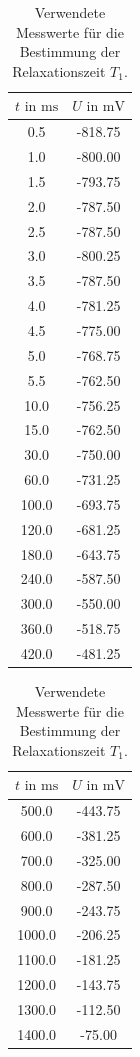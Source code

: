 \begin{table}
  \centering
  \caption{Verwendete Messwerte für die Bestimmung der Relaxationszeit $T_{1}$.}
  \label{tab:t1}
  \begin{tabular}{c c|}
  \toprule
  $t \text{ in } \si{\milli\second}$ & $U \text{ in } \si{\milli\volt}$\\
  \midrule
  0.5	&	-818.75   \\
  1.0	&	-800.00   \\
  1.5	&	-793.75   \\
  2.0	&	-787.50   \\
  2.5	&	-787.50   \\
  3.0	&	-800.25   \\
  3.5	&	-787.50   \\
  4.0	&	-781.25   \\
  4.5	&	-775.00   \\
  5.0	&	-768.75   \\
  5.5	&	-762.50   \\
  10.0	&	-756.25   \\
  15.0	&	-762.50   \\
  30.0	&	-750.00   \\
  60.0	&	-731.25   \\
  100.0	&	-693.75   \\
  120.0	&	-681.25   \\
  180.0	&	-643.75   \\
  240.0	&	-587.50   \\
  300.0	&	-550.00   \\
  360.0	&	-518.75   \\
  420.0	&	-481.25   \\
  \bottomrule
  \end{tabular}
  \begin{tabular}{|c c}
  \toprule
  $t \text{ in } \si{\milli\second}$ & $U \text{ in } \si{\milli\volt}$\\
  \midrule
  500.0	&	-443.75   \\
  600.0	&	-381.25   \\
  700.0	&	-325.00   \\
  800.0	&	-287.50   \\
  900.0	&	-243.75   \\
  1000.0	&	-206.25   \\
  1100.0	&	-181.25   \\
  1200.0	&	-143.75   \\
  1300.0	&	-112.50   \\
  1400.0	&	-75.00   \\

\end{tabular}
\end{table}
